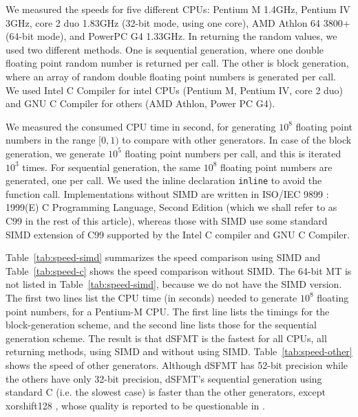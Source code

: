 \documentclass{svmult}
\begin{document}
We measured the speeds for five different CPUs: Pentium M 1.4GHz,
Pentium IV 3GHz, core 2 duo 1.83GHz (32-bit mode, using one core), AMD
Athlon 64 3800+ (64-bit mode), and PowerPC G4 1.33GHz.  In returning
the random values, we used two different methods.  One is sequential
generation, where one double floating point random number is returned
per call.  The other is block generation, where an array of random
double floating point numbers is generated per call.  We used
Intel C Compiler for intel CPUs (Pentium M, Pentium IV, core 2 duo)
and GNU C Compiler for others (AMD Athlon, Power PC G4).

We measured the consumed CPU time in second, for generating $10^8$
floating point numbers in the range $[0, 1)$ to compare with other
generators. In case of the block generation, we
generate $10^5$ floating point numbers per call, and this is
iterated $10^3$ times.  For sequential generation, the same $10^8$
floating point numbers are generated, one per call.  We used
the inline declaration {\tt inline} to avoid the function call.
Implementations without SIMD are written in
ISO/IEC 9899 : 1999(E) C Programming Language, Second Edition (which
we shall refer to as C99 in the rest of this article), whereas those
with SIMD use some standard SIMD extension of C99 supported by the
Intel C compiler and GNU C Compiler.

Table~\ref{tab:speed-simd} summarizes the speed comparison using SIMD
and Table~\ref{tab:speed-c} shows the speed comparison without
SIMD.  The 64-bit MT is not listed in Table~\ref{tab:speed-simd}, because
we do not have the SIMD version.  The first two lines list the CPU time (in
seconds) needed to generate $10^8$ floating point numbers, for a
Pentium-M CPU.  The first line lists the timings for the
block-generation scheme, and the second line lists those for the
sequential generation scheme.
The result is that dSFMT is the fastest for all CPUs, all
returning methods, using SIMD and without using SIMD.
Table~\ref{tab:speed-other} shows the speed of other
generators. Although
dSFMT has 52-bit precision while the others have only 32-bit
precision, dSFMT's sequential generation using standard
C (i.e. the slowest case) is faster than the other generators, except xorshift128
\cite{XORSHIFT-MAR}, whose quality is reported to be questionable
in \cite{XORSHIFT-LEcuyer}.
\end{document}
